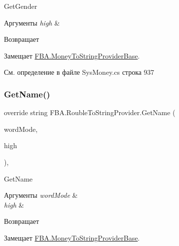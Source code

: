 Get\+Gender 


\begin{DoxyParams}{Аргументы}
{\em high} & \\
\hline
\end{DoxyParams}
\begin{DoxyReturn}{Возвращает}

\end{DoxyReturn}


Замещает \mbox{\hyperlink{class_f_b_a_1_1_money_to_string_provider_base_a24e1e1dcd1a4c42773d3ec0034a4ca6d}{F\+B\+A.\+Money\+To\+String\+Provider\+Base}}.



См. определение в файле Sys\+Money.\+cs строка 937

\mbox{\label{class_f_b_a_1_1_rouble_to_string_provider_ac31a975f1a81e576344d431956bd6e5a}} 
\subsubsection{\texorpdfstring{Get\+Name()}{GetName()}}
{\footnotesize\ttfamily override string F\+B\+A.\+Rouble\+To\+String\+Provider.\+Get\+Name (\begin{DoxyParamCaption}\item[{Number\+To\+Russian\+String.\+Word\+Mode}]{word\+Mode,  }\item[{bool}]{high }\end{DoxyParamCaption})\hspace{0.3cm}{\ttfamily [protected]}, {\ttfamily [virtual]}}



Get\+Name 


\begin{DoxyParams}{Аргументы}
{\em word\+Mode} & \\
\hline
{\em high} & \\
\hline
\end{DoxyParams}
\begin{DoxyReturn}{Возвращает}

\end{DoxyReturn}


Замещает \mbox{\hyperlink{class_f_b_a_1_1_money_to_string_provider_base_aea712eaf4a5d84eed5624e3d48988502}{F\+B\+A.\+Money\+To\+String\+Provider\+Base}}.



